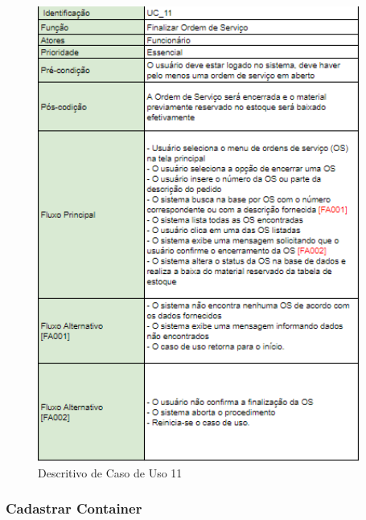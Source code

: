 \documentclass[rascunho,xindy,acronym,symbols]{fei}
\begin{document}
\begin{figure}[H]
    \centering
    \includegraphics[scale=0.6, width=300pt]{./Images/Descritivos/UC11.png}
    \caption{Descritivo de Caso de Uso 11}
     \label{fig:desc_uc11}
\end{figure}

\subsubsection{Cadastrar Container}
\end{document}
